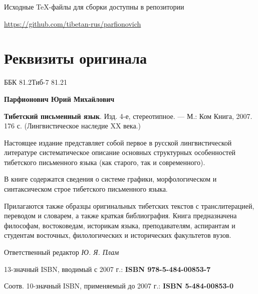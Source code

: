 \newpage

Исходные \TeX-файлы для сборки доступны в репозитории
\begin{center}
    \href{https://github.com/tibetan-rus/parfionovich}{https://github.com/tibetan-rus/parfionovich}
\end{center}

\section*{Реквизиты оригинала}

ББК 81.2Тиб-7 81.21

\textbf{Парфионович Юрий Михайлович}

\textbf{Тибетский письменный язык}. Изд. 4-е, стереотипное. --- М.: Ком Книга, 2007. 176 с. (Лингвистическое наследие XX века.)

Настоящее издание представляет собой первое в русской лингвистической литературе систематическое описание основных структурных особенностей тибетского письменного языка (как старого, так и современного).

В книге содержатся сведения о системе графики, морфологическом и синтаксическом строе тибетского письменного языка.

Прилагаются также образцы оригинальных тибетских текстов с транслитерацией, переводом и словарем, а также краткая библиография.
Книга предназначена философам, востоковедам, историкам языка, преподавателям, аспирантам и студентам восточных, филологических и исторических факультетов вузов.

Ответственный редактор \textit{Ю. Я. Плам}

13-значный ISBN, вводимый с 2007 г.: \textbf{ISBN 978-5-484-00853-7}

Соотв. 10-значный ISBN, применяемый до 2007 г.: \textbf{ISBN 5-484-00853-0}
